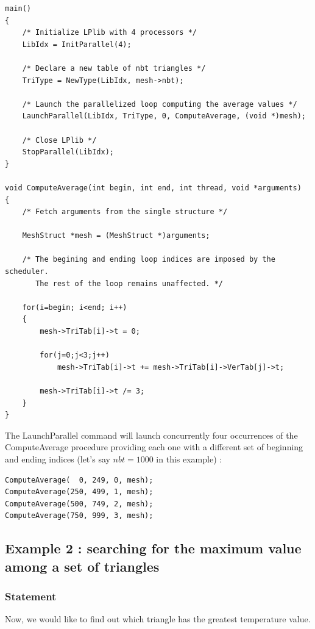 \documentclass[a4paper,12pt]{article}
\begin{document}
\begin{tt}
\begin{verbatim}
main()
{
    /* Initialize LPlib with 4 processors */
    LibIdx = InitParallel(4);

    /* Declare a new table of nbt triangles */
    TriType = NewType(LibIdx, mesh->nbt);

    /* Launch the parallelized loop computing the average values */
    LaunchParallel(LibIdx, TriType, 0, ComputeAverage, (void *)mesh);

    /* Close LPlib */
    StopParallel(LibIdx);
}

void ComputeAverage(int begin, int end, int thread, void *arguments)
{
    /* Fetch arguments from the single structure */

    MeshStruct *mesh = (MeshStruct *)arguments;

    /* The begining and ending loop indices are imposed by the scheduler.
       The rest of the loop remains unaffected. */

    for(i=begin; i<end; i++)
    {
        mesh->TriTab[i]->t = 0;

        for(j=0;j<3;j++)
            mesh->TriTab[i]->t += mesh->TriTab[i]->VerTab[j]->t;

        mesh->TriTab[i]->t /= 3;
    }
}
\end{verbatim}
\end{tt}
\normalfont

The LaunchParallel command will launch concurrently four occurrences of the ComputeAverage procedure providing each one with a different set of beginning and ending indices (let's say $nbt = 1000$ in this example) :

\begin{tt}
\begin{verbatim}
ComputeAverage(  0, 249, 0, mesh);
ComputeAverage(250, 499, 1, mesh);
ComputeAverage(500, 749, 2, mesh);
ComputeAverage(750, 999, 3, mesh);
\end{verbatim}
\end{tt}
\normalfont


\subsection{Example 2 : searching for the maximum value among a set of triangles}

\subsubsection{Statement}
Now, we would like to find out which triangle has the greatest temperature value.
\end{document}
